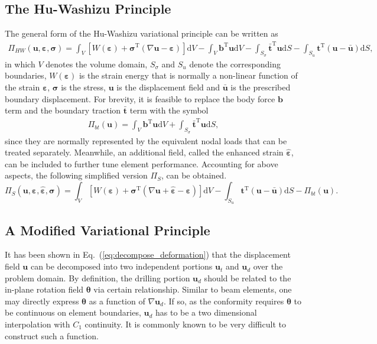 \documentclass[3p,sort&compress,review,11pt]{elsarticle}
\newcommand*{\md}[1]{\mathrm{d}#1}
\newcommand*{\mT}{\mathrm{T}}
\newcommand*{\eqsref}[1]{Eq.~(\ref{#1})}
\newcommand*{\mb}{\bm}
\begin{document}
\subsection{The Hu-Washizu Principle}
The general form of the Hu-Washizu variational principle \citep{Hu1954} can be written as
\begin{gather*}
\varPi_{HW}\left(\mb{u},\mb{\varepsilon},\mb{\sigma}\right)=\int_V{}\left[W\left(\mb{\varepsilon}\right)+\mb{\sigma}^\mT\left(\nabla\mb{u}-\mb{\varepsilon}\right)\right]\md{V}-\int_V\mb{b}^\mT\mb{u}\md{V}-\int_{S_\sigma}\bar{\mb{t}}^\mT\mb{u}\md{S}-\int_{S_u}\mb{t}^\mT\left(\mb{u}-\bar{\mb{u}}\right)\md{S},
\end{gather*}
in which $V$ denotes the volume domain, $S_\sigma$ and $S_u$ denote the corresponding boundaries, $W\left(\mb{\varepsilon}\right)$ is the strain energy that is normally a non-linear function of the strain $\mb{\varepsilon}$, $\mb{\sigma}$ is the stress, $\mb{u}$ is the displacement field and $\bar{\mb{u}}$ is the prescribed boundary displacement. For brevity, it is feasible to replace the body force $\mb{b}$ term and the boundary traction $\bar{\mb{t}}$ term with the symbol
\begin{gather*}
\varPi_{bt}\left(\mb{u}\right)=\int_V\mb{b}^\mT\mb{u}\md{V}+\int_{S_\sigma}\bar{\mb{t}}^\mT\mb{u}\md{S},
\end{gather*}
since they are normally represented by the equivalent nodal loads that can be treated separately. Meanwhile, an additional field, called the enhanced strain $\hat{\mb{\varepsilon}}$, can be included to further tune element performance. Accounting for above aspects, the following simplified version $\varPi_S$, can be obtained.
\begin{equation}\label{eq:hu_washizu_simplified}
\varPi_S\left(\mb{u},\mb{\varepsilon},\hat{\mb{\varepsilon}},\mb{\sigma}\right)=\int_V\left[W\left(\mb{\varepsilon}\right)+\mb{\sigma}^\mT\left(\nabla\mb{u}+\hat{\mb{\varepsilon}}-\mb{\varepsilon}\right)\right]\md{V}-\int_{S_u}\mb{t}^\mT\left(\mb{u}-\bar{\mb{u}}\right)\md{S}-\varPi_{bt}\left(\mb{u}\right).
\end{equation}
\subsection{A Modified Variational Principle}
It has been shown in \eqsref{eq:decompose_deformation} that the displacement field $\mb{u}$ can be decomposed into two independent portions $\mb{u}_t$ and $\mb{u}_d$ over the problem domain. By definition, the drilling portion $\mb{u}_d$ should be related to the in-plane rotation field $\mb{\theta}$ via certain relationship. Similar to beam elements, one may directly express $\mb{\theta}$ as a function of $\nabla\mb{u}_d$. If so, as the conformity requires $\mb{\theta}$ to be continuous on element boundaries, $\mb{u}_d$ has to be a two dimensional interpolation with $C_1$ continuity. It is commonly known to be very difficult to construct such a function.
\end{document}
